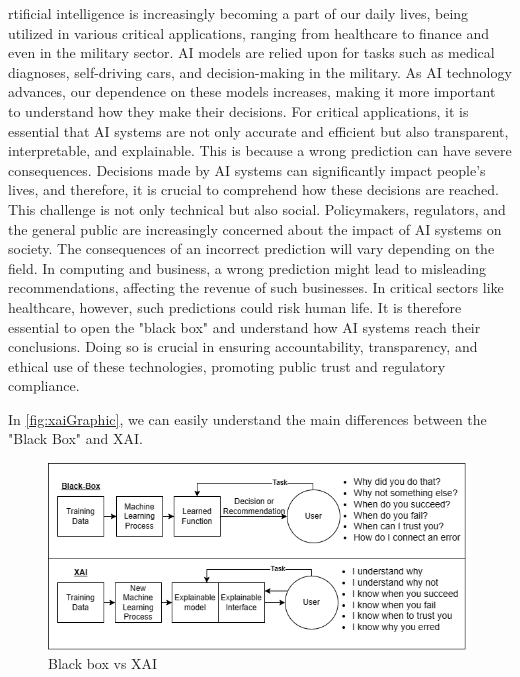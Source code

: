 \documentclass[10pt,journal,compsoc]{IEEEtran}
\begin{document}
rtificial intelligence is increasingly becoming a part of our daily lives, being utilized in various critical applications, ranging from healthcare to finance and
even in the military sector. AI models are relied upon for tasks such as medical diagnoses, self-driving cars, and decision-making in the military. As AI technology advances, 
our dependence on these models increases, making it more important to understand how they make their decisions. For critical applications, it is essential that AI systems 
are not only accurate and efficient but also transparent, interpretable, and explainable. This is because a wrong prediction can have severe consequences.\cite{transparency} Decisions made by 
AI systems can significantly impact people's lives, and therefore, it is crucial to comprehend how these decisions are reached.\cite{analytical-review}
This challenge is not only technical but also social. Policymakers, regulators, and the general public are increasingly concerned about the impact of AI systems on society.\cite{doshivelez2017rigorous}
The consequences of an incorrect prediction will vary depending on the field. In computing and business, a wrong prediction might lead to misleading recommendations, affecting 
the revenue of such businesses. In critical sectors like healthcare, however, such predictions could risk human life. It is therefore essential to open the "black box" and 
understand how AI systems reach their conclusions. Doing so is crucial in ensuring accountability, transparency, and ethical use of these technologies, promoting public trust 
and regulatory compliance.\cite{analytical-review}

In \autoref{fig:xaiGraphic}, we can easily understand the main differences between the "Black Box" and XAI.\cite{xai-concept}

\begin{figure}[h]
    \centering
    \includegraphics[scale=0.39]{images/xaiGraphic.png}
    \caption{Black box vs XAI}
    \label{fig:xaiGraphic}
\end{figure}
\end{document}
